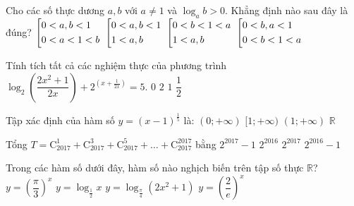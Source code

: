 \begin{ex}%
	Cho các số thực dương $a, b$ với $a\ne 1$ và $\log_ab > 0$. Khẳng định nào sau đây là đúng?
	\choice
	{$\left[\begin{aligned}
			& 0 < a, b < 1 \\ 
			& 0 < a < 1 < b \end{aligned}\right.$}
	{\True $\left[\begin{aligned}
			& 0 < a, b < 1 \\ 
			& 1 < a, b \end{aligned}\right.$}
	{$\left[\begin{aligned}
			& 0 < b < 1 < a \\ 
			& 1 < a, b\end{aligned}\right.$}
	{$\left[\begin{aligned}
			& 0 < b, a < 1 \\ 
			& 0 < b < 1 < a\end{aligned}\right.$}
\end{ex}
\begin{ex}%
	Tính tích tất cả các nghiệm thực của phương trình $\log_2\left(\dfrac{2x^2+1}{2x}\right)+2^{\left(x+\frac{1}{2x}\right)}=5$. 
	\choice
	{$0$}
	{$2$}
	{$1$}
	{\True $\dfrac{1}{2}$}
\end{ex}
\begin{ex}%
	Tập xác định của hàm số $y =(x-1) ^{\tfrac{1}{5}}$ là:
	\choice
	{$(0;+\infty)$}
	{$[1;+\infty)$}
	{\True $(1;+\infty)$}
	{$\mathbb{R}$}
\end{ex}
\begin{ex}%
	Tổng $T=\mathrm{C}_{2017} ^{1}+ \mathrm{C}_{2017} ^{3}+ \mathrm{C}_{2017} ^{5} +\ldots+\mathrm{C}_{2017} ^{2017}$ bằng
	\choice
	{$2^{2017}- 1$}
	{\True $2^{2016}$}
	{$2^{2017}$}
	{$2^{2016}- 1$}
\end{ex}
\begin{ex}%
	Trong các hàm số dưới đây, hàm số nào nghịch biến trên tập số thực $\mathbb{R}$?
	\choice
	{$y=\left (\dfrac{\pi}{3} \right) ^{x}$}
	{$y=\log_{\tfrac{1}{2}} x$}
	{$y=\log_{\tfrac{\pi}{4}}(2x^2+1)$}
	{\True $y=\left (\dfrac{2}{e} \right) ^{x}$}
\end{ex}
